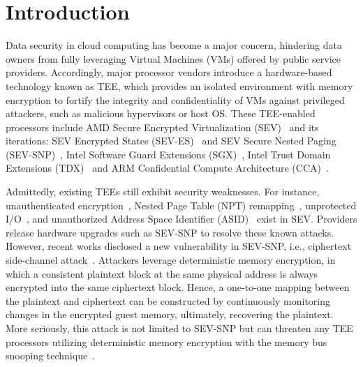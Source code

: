 \section{Introduction}
\label{sec:introduction}

Data security in cloud computing has become a major concern, hindering data owners from fully leveraging Virtual Machines (VMs) offered by public service providers.
Accordingly, major processor vendors introduce a hardware-based technology known as TEE, which provides an isolated environment with memory encryption to fortify the integrity and confidentiality of VMs against privileged attackers, such as malicious hypervisors or host OS.
These TEE-enabled processors include AMD Secure Encrypted Virtualization (SEV)~\cite{kaplan2016amd} and its iterations: SEV Encrypted States (SEV-ES)~\cite{kaplan2017protecting} and SEV Secure Nested Paging (SEV-SNP)~\cite{kaplan2020amd}, Intel Software Guard Extensions (SGX)~\cite{intelsgx, johnson2021supporting}, Intel Trust Domain Extensions (TDX)~\cite{inteltdx} and ARM Confidential Compute Architecture (CCA)~\cite{armcca}.

Admittedly, existing TEEs still exhibit security weaknesses. For instance, unauthenticated encryption~\cite{buhren2017fault, du2017secure, wilke2020sevurity}, Nested Page Table (NPT) remapping~\cite{hetzelt2017security, morbitzer2019extracting, morbitzer2018severed}, unprotected I/O~\cite{li2019exploiting}, and unauthorized Address Space Identifier (ASID)~\cite{li2021crossline} exist in SEV. 
Providers release hardware upgrades such as SEV-SNP to resolve these known attacks.
However, recent works disclosed a new vulnerability in SEV-SNP, i.e., ciphertext side-channel attack~\cite{li2021cipherleaks, li2022systematic}.
Attackers leverage deterministic memory encryption, in which a consistent plaintext block at the same physical address is always encrypted into the same ciphertext block.
Hence, a one-to-one mapping between the plaintext and ciphertext can be constructed by continuously monitoring changes in the encrypted guest memory, ultimately, recovering the plaintext.
More seriously, this attack is not limited to SEV-SNP but can threaten any TEE processors utilizing deterministic memory encryption with the memory bus snooping technique~\cite{lee2020off}.

